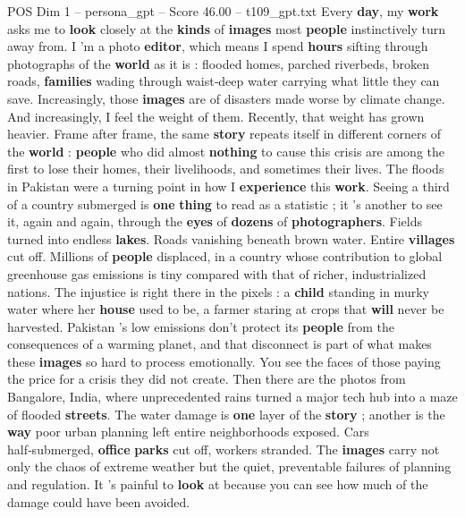\begin{textsample}{POS Dim 1 – persona\_gpt – Score 46.00 – t109\_gpt.txt}  \label{ex:f1_pos_024}
Every \textbf{day}, my \textbf{work} asks me to \textbf{look} closely at the \textbf{kinds} of \textbf{images} most \textbf{people} instinctively turn away from.
I ’m a photo \textbf{editor}, which means I spend \textbf{hours} sifting through photographs of the \textbf{world} as it is : flooded homes, parched riverbeds, broken roads, \textbf{families} wading through waist‑deep water carrying what little they can save.
Increasingly, those \textbf{images} are of disasters made worse by climate change.
And increasingly, I feel the weight of them.
Recently, that weight has grown heavier.
Frame after frame, the same \textbf{story} repeats itself in different corners of the \textbf{world} : \textbf{people} who did almost \textbf{nothing} to cause this crisis are among the first to lose their homes, their livelihoods, and sometimes their lives.
The floods in Pakistan were a turning point in how I \textbf{experience} this \textbf{work}.
Seeing a third of a country submerged is \textbf{one} \textbf{thing} to read as a statistic ; it ’s another to see it, again and again, through the \textbf{eyes} of \textbf{dozens} of \textbf{photographers}.
Fields turned into endless \textbf{lakes}.
Roads vanishing beneath brown water.
Entire \textbf{villages} cut off.
Millions of \textbf{people} displaced, in a country whose contribution to global greenhouse gas emissions is tiny compared with that of richer, industrialized nations.
The injustice is right there in the pixels : a \textbf{child} standing in murky water where her \textbf{house} used to be, a farmer staring at crops that \textbf{will} never be harvested.
Pakistan ’s low emissions don't protect its \textbf{people} from the consequences of a warming planet, and that disconnect is part of what makes these \textbf{images} so hard to process emotionally.
You see the faces of those paying the price for a crisis they did not create.
Then there are the photos from Bangalore, India, where unprecedented rains turned a major tech hub into a maze of flooded \textbf{streets}.
The water damage is \textbf{one} layer of the \textbf{story} ; another is the \textbf{way} poor urban planning left entire neighborhoods exposed.
Cars half‑submerged, \textbf{office} \textbf{parks} cut off, workers stranded.
The \textbf{images} carry not only the chaos of extreme weather but the quiet, preventable failures of planning and regulation.
It ’s painful to \textbf{look} at because you can see how much of the damage could have been avoided.

\end{textsample}
